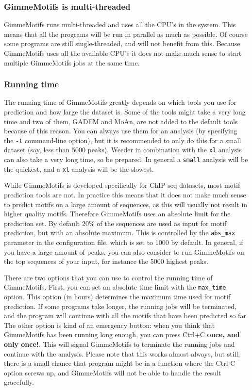 \documentclass[11pt]{article}
\begin{document}
\subsubsection{GimmeMotifs is multi-threaded}
GimmeMotifs runs multi-threaded and uses all the CPU's in the system. This means that all the programs will be run in parallel as much as possible. Of course some programs are still single-threaded, and will not benefit from this. Because GimmeMotifs uses all the available CPU's it does not make much sense to start multiple GimmeMotifs jobs at the same time. 

\subsubsection{Running time}
The running time of GimmeMotifs greatly depends on which tools you use for prediction and how large the dataset is. Some of the tools might take a very long time and two of them, GADEM and MoAn, are not added to the default tools because of this reason. You can always use them for an analysis (by specifying the \texttt{-t} command-line option), but it is recommended to only do this for a small dataset (say, less than 5000 peaks). Weeder in combination with the \texttt{xl} analysis can also take a very long time, so be prepared. In general a \texttt{small} analysis will be the quickest, and a \texttt{xl} analysis will be the slowest.

While GimmeMotifs is developed specifically for ChIP-seq datasets, most motif prediction tools are not. In practice this means that it does not make much sense to predict motifs on a large amount of sequences, as this will usually not result in higher quality motifs. Therefore GimmeMotifs uses an absolute limit for the prediction set. By default 20\% of the sequences are used as input for motif prediction, but with an absolute maximum. This is controlled by the \texttt{abs\_max} parameter in the configuration file, which is set to 1000 by default. In general, if you have a large amount of peaks, you can also consider to run GimmeMotifs on the top sequences of your input, for instance the 5000 highest peaks. 

There are two options that you can use to control the running time of GimmeMotifs. First, you can set an absolute time limit with the \texttt{max\_time} option. This option (in hours) determines the maximum time used for motif prediction. If some programs take longer, the running jobs will be terminated, and the program will continue with all the motifs that have been predicted so far. The other option is kind of an emergency button: when you think that GimmeMotifs has been running long enough, you can press Ctrl+C \textbf{once, and only once!}. This will signal GimmeMotifs to terminate the running jobs and continue with the analysis. Please note that this works almost always, but still, there is a small chance that program might be in a function where the Ctrl-C option screws up, and GimmeMotifs will not be able to handle the result gracefully. 
\end{document}
